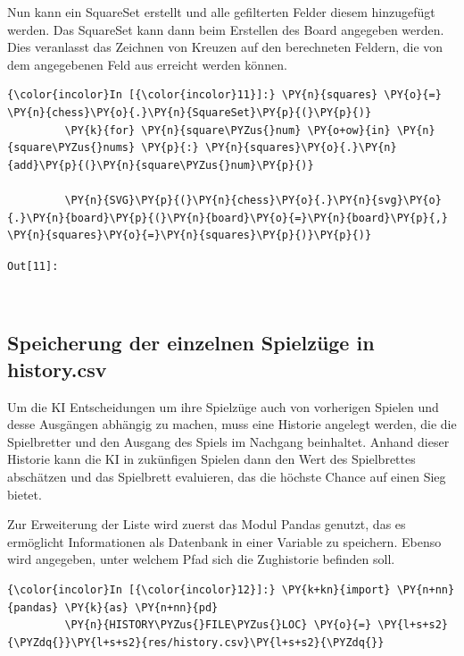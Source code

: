     Nun kann ein SquareSet erstellt und alle gefilterten Felder diesem
hinzugefügt werden. Das SquareSet kann dann beim Erstellen des Board
angegeben werden. Dies veranlasst das Zeichnen von Kreuzen auf den
berechneten Feldern, die von dem angegebenen Feld aus erreicht werden
können.

    \begin{Verbatim}[commandchars=\\\{\}]
{\color{incolor}In [{\color{incolor}11}]:} \PY{n}{squares} \PY{o}{=} \PY{n}{chess}\PY{o}{.}\PY{n}{SquareSet}\PY{p}{(}\PY{p}{)}
         \PY{k}{for} \PY{n}{square\PYZus{}num} \PY{o+ow}{in} \PY{n}{square\PYZus{}nums} \PY{p}{:} \PY{n}{squares}\PY{o}{.}\PY{n}{add}\PY{p}{(}\PY{n}{square\PYZus{}num}\PY{p}{)}
         
         \PY{n}{SVG}\PY{p}{(}\PY{n}{chess}\PY{o}{.}\PY{n}{svg}\PY{o}{.}\PY{n}{board}\PY{p}{(}\PY{n}{board}\PY{o}{=}\PY{n}{board}\PY{p}{,} \PY{n}{squares}\PY{o}{=}\PY{n}{squares}\PY{p}{)}\PY{p}{)}
\end{Verbatim}

\texttt{\color{outcolor}Out[{\color{outcolor}11}]:}
    
    \begin{center}
    \end{center}
    { \hspace*{\fill} \\}
    

    \subsection{Speicherung der einzelnen Spielzüge in
history.csv}\label{speicherung-der-einzelnen-spielzuxfcge-in-history.csv}

Um die KI Entscheidungen um ihre Spielzüge auch von vorherigen Spielen
und desse Ausgängen abhängig zu machen, muss eine Historie angelegt
werden, die die Spielbretter und den Ausgang des Spiels im Nachgang
beinhaltet. Anhand dieser Historie kann die KI in zukünfigen Spielen
dann den Wert des Spielbrettes abschätzen und das Spielbrett evaluieren,
das die höchste Chance auf einen Sieg bietet.

Zur Erweiterung der Liste wird zuerst das Modul Pandas genutzt, das es
ermöglicht Informationen als Datenbank in einer Variable zu speichern.
Ebenso wird angegeben, unter welchem Pfad sich die Zughistorie befinden
soll.

    \begin{Verbatim}[commandchars=\\\{\}]
{\color{incolor}In [{\color{incolor}12}]:} \PY{k+kn}{import} \PY{n+nn}{pandas} \PY{k}{as} \PY{n+nn}{pd}
         \PY{n}{HISTORY\PYZus{}FILE\PYZus{}LOC} \PY{o}{=} \PY{l+s+s2}{\PYZdq{}}\PY{l+s+s2}{res/history.csv}\PY{l+s+s2}{\PYZdq{}}
\end{Verbatim}


